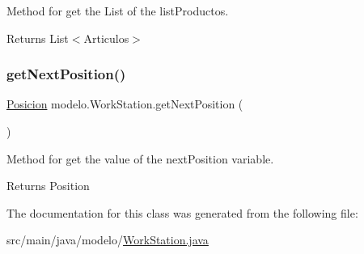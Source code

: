 Method for get the List of the list\+Productos. 

\begin{DoxyReturn}{Returns}
List$<$\+Articulos$>$ 
\end{DoxyReturn}
\mbox{\label{classmodelo_1_1_work_station_a1a51d9eb9af6508169f216cbcfb3c605}} 
\subsubsection{\texorpdfstring{get\+Next\+Position()}{getNextPosition()}}
{\footnotesize\ttfamily \mbox{\hyperlink{classmodelo_1_1_posicion}{Posicion}} modelo.\+Work\+Station.\+get\+Next\+Position (\begin{DoxyParamCaption}{ }\end{DoxyParamCaption})}



Method for get the value of the next\+Position variable. 

\begin{DoxyReturn}{Returns}
Position 
\end{DoxyReturn}


The documentation for this class was generated from the following file\+:\begin{DoxyCompactItemize}
\item 
src/main/java/modelo/\mbox{\hyperlink{_work_station_8java}{Work\+Station.\+java}}\end{DoxyCompactItemize}
